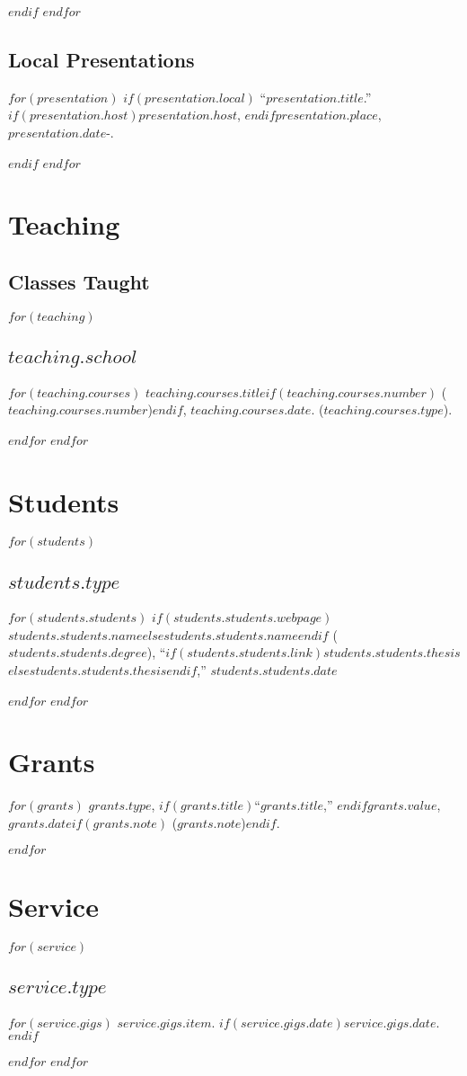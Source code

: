 \documentclass[11pt]{article}
\def\printdate#1{\xprintdate#1-}
\def\xprintdate#1-#2-#3-{#1}
\begin{document}
$endif$
$endfor$

\subsection{Local Presentations}

$for(presentation)$
$if(presentation.local)$
\ind ``$presentation.title$.'' $if(presentation.host)$$presentation.host$, $endif$$presentation.place$, \printdate{$presentation.date$}.

$endif$
$endfor$

\section{Teaching}

\subsection{Classes Taught}

$for(teaching)$
\subsection{$teaching.school$}
$for(teaching.courses)$
\ind $teaching.courses.title$$if(teaching.courses.number)$ ($teaching.courses.number$)$endif$, $teaching.courses.date$. ($teaching.courses.type$).

$endfor$
$endfor$

\section{Students}

$for(students)$
\subsection{$students.type$}
$for(students.students)$
\ind $if(students.students.webpage)$\href{$students.students.webpage$}{$students.students.name$}$else$$students.students.name$$endif$ ($students.students.degree$), ``$if(students.students.link)$\href{$students.students.link$}{$students.students.thesis$}$else$$students.students.thesis$$endif$,'' $students.students.date$

$endfor$
$endfor$

\section{Grants}

$for(grants)$
\ind $grants.type$, $if(grants.title)$``$grants.title$,'' $endif$$grants.value$, $grants.date$$if(grants.note)$ ($grants.note$)$endif$.

$endfor$

\section{Service}

$for(service)$
\subsection{$service.type$}
$for(service.gigs)$
\ind $service.gigs.item$. $if(service.gigs.date)$$service.gigs.date$.$endif$

$endfor$
$endfor$
\end{document}
